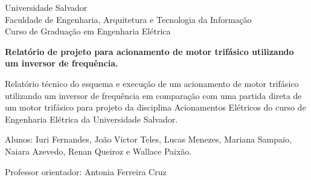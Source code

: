 \documentclass[a4paper, 12pt,oneside, english, brazil]{abntex2}
\begin{document}


\begin{folhaderosto}
    
	\begin{center}
	

		\LARGE{Universidade Salvador}\\
		\large{ Faculdade de Engenharia, Arquitetura e Tecnologia da Informação}\\ 
		\large{ Curso de Graduação em Engenharia Elétrica}\\ 
\vspace{15pt}
        
        \vspace{85pt}
        
		\textbf{\LARGE{Relatório de projeto para acionamento de motor trifásico utilizando um inversor de frequência.}}
			
	\end{center}
\vspace{1,5cm}
	
	\begin{flushright}

   \begin{list}{}{
      \setlength{\leftmargin}{6.5cm}
      \setlength{\rightmargin}{0cm}
     \setlength{\labelwidth}{0pt}
     \setlength{\labelsep}{\leftmargin}}

      \item Relatório técnico do esquema e execução de um acionamento de motor trifásico utilizando um inversor de frequência em comparação com uma partida direta de um motor trifásico para projeto da disciplina Acionamentos Elétricos do curso de Engenharia Elétrica da Universidade Salvador.

      \begin{list}{}{
      \setlength{\leftmargin}{0cm}
      \setlength{\rightmargin}{0cm}
      \setlength{\labelwidth}{0pt}
      \setlength{\labelsep}{\leftmargin}}

			\item Alunos: Iuri Fernandes, João Victor Teles, Lucas Menezes, Mariana Sampaio, Naiara Azevedo, Renan Queiroz e Wallace Paixão. \
            \item Professor orientador: Antonia Ferreira Cruz\
      		


\end{list}
\end{list}
\end{flushright}
\end{folhaderosto}
\end{document}
